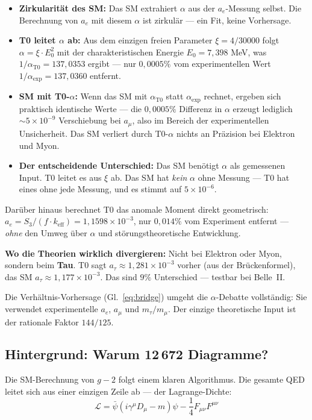 \begin{itemize}
	\item \textbf{Zirkularität des SM:} Das SM extrahiert $\alpha$ aus der $a_e$-Messung selbst. Die Berechnung von $a_e$ mit diesem $\alpha$ ist zirkulär — ein Fit, keine Vorhersage.
	\item \textbf{T0 leitet $\alpha$ ab:} Aus dem einzigen freien Parameter $\xi = 4/30000$ folgt $\alpha = \xi \cdot E_0^2$ mit der charakteristischen Energie $E_0 = 7{,}398$ MeV, was $1/\alpha_\text{T0} = 137{,}0353$ ergibt — nur $0{,}0005\%$ vom experimentellen Wert $1/\alpha_\text{exp} = 137{,}0360$ entfernt.
	\item \textbf{SM mit T0-$\alpha$:} Wenn das SM mit $\alpha_\text{T0}$ statt $\alpha_\text{exp}$ rechnet, ergeben sich praktisch identische Werte — die $0{,}0005\%$ Differenz in $\alpha$ erzeugt lediglich $\sim 5 \times 10^{-9}$ Verschiebung bei $a_\mu$, also im Bereich der experimentellen Unsicherheit. Das SM verliert durch T0-$\alpha$ nichts an Präzision bei Elektron und Myon.
	\item \textbf{Der entscheidende Unterschied:} Das SM benötigt $\alpha$ als gemessenen Input. T0 leitet es aus $\xi$ ab. Das SM hat \textit{kein} $\alpha$ ohne Messung — T0 hat eines ohne jede Messung, und es stimmt auf $5 \times 10^{-6}$.
\end{itemize}

Darüber hinaus berechnet T0 das anomale Moment direkt geometrisch: $a_e = S_3/(f \cdot k_\text{eff}) = 1{,}1598 \times 10^{-3}$, nur $0{,}014\%$ vom Experiment entfernt — \textit{ohne} den Umweg über $\alpha$ und störungstheoretische Entwicklung.

\textbf{Wo die Theorien wirklich divergieren:} Nicht bei Elektron oder Myon, sondern beim \textbf{Tau}. T0 sagt $a_\tau \approx 1{,}281 \times 10^{-3}$ vorher (aus der Brückenformel), das SM $a_\tau \approx 1{,}177 \times 10^{-3}$. Das sind $9\%$ Unterschied — testbar bei Belle~II.

Die Verhältnis-Vorhersage (Gl.~\ref{eq:bridge}) umgeht die $\alpha$-Debatte vollständig: Sie verwendet experimentelle $a_e$, $a_\mu$ und $m_\tau/m_\mu$. Der einzige theoretische Input ist der rationale Faktor $144/125$.

\subsection{Hintergrund: Warum 12\,672 Diagramme?}

Die SM-Berechnung von $g-2$ folgt einem klaren Algorithmus. Die gesamte QED leitet sich aus einer einzigen Zeile ab — der Lagrange-Dichte:
\begin{equation}
	\mathcal{L} = \bar{\psi}(i\gamma^\mu D_\mu - m)\psi - \frac{1}{4}F_{\mu\nu}F^{\mu\nu}
\end{equation}

